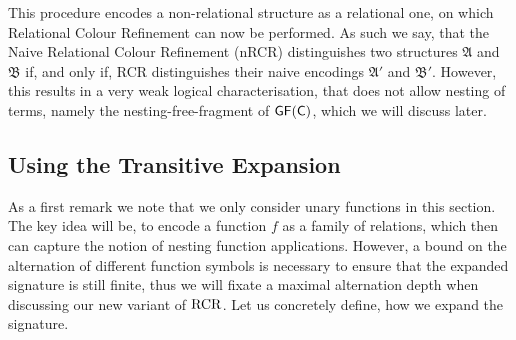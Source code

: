 This procedure encodes a non-relational structure as a relational one, on which Relational Colour Refinement can now be performed.
As such we say, that the Naive Relational Colour Refinement (nRCR) distinguishes two structures $\mathfrak A$ and $\mathfrak B$ if, and only if, RCR distinguishes their naive encodings $\mathfrak A'$ and $\mathfrak B'$.
However, this results in a very weak logical characterisation, that does not allow nesting of terms, namely the nesting-free-fragment of $\mathsf{GF}(\mathsf{C})$, which we will discuss later.

\subsection{Using the Transitive Expansion} 
\label{sec:TransitiveExpansion}

As a first remark we note that we only consider unary functions in this section.
The key idea will be, to encode a function $f$ as a family of relations, which then can capture the notion of nesting function applications.
However, a bound on the alternation of different function symbols is necessary to ensure that the expanded signature is still finite, thus we will fixate a maximal alternation depth when discussing our new variant of $\operatorname{RCR}$.
Let us concretely define, how we expand the signature.

